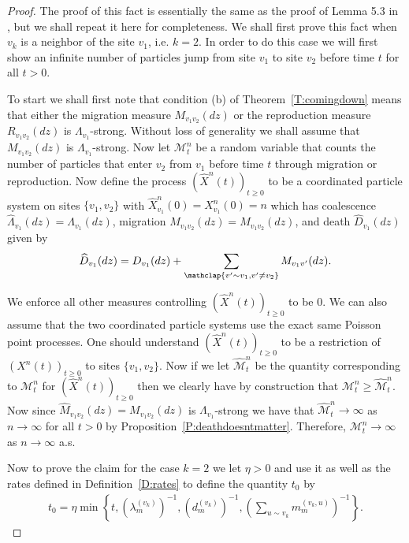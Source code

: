 \documentclass[11pt]{article}
\theoremstyle{definition}
\newcommand{\thmref}[1]{Theorem~\ref{T:#1}}
\newcommand{\defref}[1]{Definition~\ref{D:#1}}
\newcommand{\propref}[1]{Proposition~\ref{P:#1}}
\begin{document}
\begin{proof}
    The proof of this fact is essentially the same as the proof of Lemma 5.3 in \cite{Angel2012}, but we shall repeat it here for completeness. We shall first prove this fact when $v_k$ is a neighbor of the site $v_1$, i.e. $k = 2$. In order to do this case we will first show an infinite number of particles jump from site $v_1$ to site $v_2$ before time $t$ for all $t > 0$.
    \medskip

    \noindent To start we shall first note that condition (b) of \thmref{comingdown} means that either the migration measure $M_{v_1v_2}(dz)$ or the reproduction measure $R_{v_1v_2}(dz)$ is $\Lambda_{v_1}$-strong. Without loss of generality we shall assume that $M_{v_1v_2}(dz)$ is $\Lambda_{v_1}$-strong. Now let $\mathcal{M}^n_t$ be a random variable that counts the number of particles that enter $v_2$ from $v_1$ before time $t$ through migration or reproduction. Now define the process $(\widehat{X}^n(t))_{t \geq 0}$ to be a coordinated particle system on sites $\{v_1, v_2\}$ with $\widehat{X}^n_{v_1}(0) = X^n_{v_1}(0) = n$ which has coalescence $\widehat{\Lambda}_{v_1}(dz) = \Lambda_{v_1}(dz)$, migration $\widehat{M}_{v_{1}v_2}(dz) = M_{v_{1}v_2}(dz)$, and death $\widehat{D}_{v_1}(dz)$ given by
    \begin{align*}
        \widehat{D}_{v_1}(dz) = D_{v_1}(dz) + \sum_{\mathclap{v' \sim v_1, v'\neq v_2}} M_{v_1v'}(dz).
    \end{align*}

    \noindent We enforce all other measures controlling $(\widehat{X}^n(t))_{t \geq 0}$ to be $0$. We can also assume that the two coordinated particle systems use the exact same Poisson point processes. One should understand $(\widehat{X}^n(t))_{t \geq 0}$ to be a restriction of $(X^n(t))_{t \geq 0}$ to sites $\{v_1, v_2\}$. Now if we let $\widehat{\mathcal{M}}^n_t$ be the quantity corresponding to $\mathcal{M}^n_t$ for $(\widehat{X}^n(t))_{t \geq 0}$ then we clearly have by construction that $\mathcal{M}^n_t \geq \widehat{\mathcal{M}}^n_t$. Now since $\widehat{M}_{v_1v_2}(dz) = M_{v_1v_2}(dz)$ is $\Lambda_{v_1}$-strong we have that $\widehat{\mathcal{M}}^n_t \to \infty$ as $n \to \infty$ for all $t > 0$ by \propref{deathdoesntmatter}. Therefore, $\mathcal{M}^n_t \to \infty$ as $n \to \infty$ a.s. 
    \medskip
    
    \noindent Now to prove the claim for the case $k = 2$ we let $\eta > 0$ and use it as well as the rates defined in \defref{rates} to define the quantity $t_0$ by
    \begin{align*}
        t_0 = \eta \min\left\{t, \left({\lambda_m^{(v_k)}}\right)^{-1}, \left({d_m^{(v_k)}}\right)^{-1}, \left(\sum_{u \sim v_k} m_m^{(v_k,u)}\right)^{-1}\right\}.
    \end{align*}
    

\end{proof}
\end{document}
